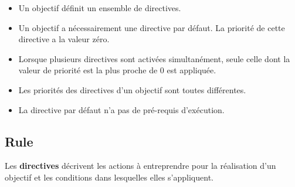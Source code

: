 \begin{itemize}
        \item Un objectif définit un ensemble de directives.
        \item Un objectif a nécessairement une directive par défaut. La priorité de cette directive a la valeur zéro.
        \item Lorsque plusieurs directives sont activées simultanément, seule celle dont la valeur de priorité est la plus proche de 0 est appliquée.
        \item Les priorités des directives d'un objectif sont toutes différentes.
        \item La directive par défaut n'a pas de pré-requis d'exécution.
    \end{itemize}
    
\subsection{Rule}
Les \textbf{directives} décrivent les actions à entreprendre pour la réalisation d'un objectif et les conditions dans lesquelles elles s'appliquent.
